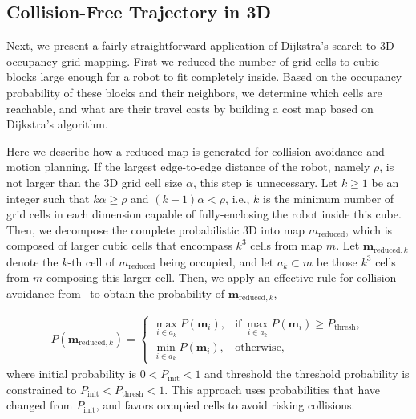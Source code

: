 \documentclass[conf]{new-aiaa}
\begin{document}
\subsection{Collision-Free Trajectory in 3D}

Next, we present a fairly straightforward application of Dijkstra's search to 3D occupancy grid mapping. First we reduced the number of grid cells to cubic blocks large enough for a robot to fit completely inside. Based on the occupancy probability of these blocks and their neighbors, we determine which cells are reachable, and what are their travel costs by building a cost map based on Dijkstra's algorithm.

Here we describe how a reduced map is generated for collision avoidance and motion planning. If the largest edge-to-edge distance of the robot, namely $\rho$, is not larger than the 3D grid cell size $\alpha$, this step is unnecessary. Let $k\geq1$ be an integer such that $k\alpha\geq\rho$ and $(k-1)\alpha<\rho$, i.e., $k$ is the minimum number of grid cells in each dimension capable of fully-enclosing the robot inside this cube. Then, we decompose the complete probabilistic 3D into map $ m_\text{reduced}$, which is composed of larger cubic cells that encompass $k^3$ cells from map $ m$. Let $\mathbf{m}_{\text{reduced},k}$ denote the $k$-th cell of $ m_\text{reduced}$ being occupied, and let $a_k\subset m$ be those $k^3$ cells from $ m$ composing this larger cell. Then, we apply an effective rule for collision-avoidance from~\cite{KauTakAiLee18} to obtain the probability of $\mathbf{m}_{\text{reduced},k}$,

\begin{align}
\label{eqn:Proj3DMapComb}
P(\mathbf{m}_{\text{reduced},k})= 
\begin{cases}
    \max_{i\in a_k}{P(\mathbf{m}_i)},	&\text{if} \ \max_{i\in a_k}{P(\mathbf{m}_i)}\geq P_\text{thresh},\\
    \min_{i\in a_k}{P(\mathbf{m}_i)},	& \text{otherwise},
\end{cases}
\end{align}
where initial probability is $0<P_\text{init}<1$ and threshold the threshold probability is constrained to $P_\text{init}<P_\text{thresh}<1$. This approach uses probabilities that have changed from $P_\text{init}$, and favors occupied cells to avoid risking collisions.
\end{document}
